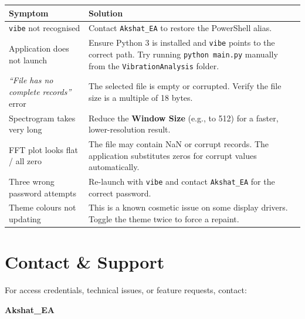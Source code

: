 \documentclass[12pt, a4paper]{article}
\begin{document}
\begin{center}
\begin{tabularx}{\linewidth}{lX}
\toprule
\textbf{Symptom} & \textbf{Solution}\\
\midrule
\texttt{vibe} not recognised & Contact \texttt{Akshat\_EA} to restore the
                               PowerShell alias. \\[4pt]
Application does not launch  & Ensure Python 3 is installed and
                               \texttt{vibe} points to the correct path.
                               Try running \texttt{python main.py} manually
                               from the \texttt{VibrationAnalysis} folder. \\[4pt]
\textit{``File has no complete records''} error & The selected file is empty
                               or corrupted.  Verify the file size is a
                               multiple of 18 bytes. \\[4pt]
Spectrogram takes very long  & Reduce the \textbf{Window Size} (e.g., to 512)
                               for a faster, lower-resolution result. \\[4pt]
FFT plot looks flat / all zero & The file may contain NaN or corrupt records.
                               The application substitutes zeros for corrupt
                               values automatically. \\[4pt]
Three wrong password attempts & Re-launch with \texttt{vibe} and contact
                               \texttt{Akshat\_EA} for the correct password. \\[4pt]
Theme colours not updating   & This is a known cosmetic issue on some
                               display drivers.  Toggle the theme twice
                               to force a repaint. \\
\bottomrule
\end{tabularx}
\end{center}

\section{Contact \& Support}

For access credentials, technical issues, or feature requests, contact:

\begin{center}
\Large\textbf{\color{accent} Akshat\_EA}
\end{center}
\end{document}
